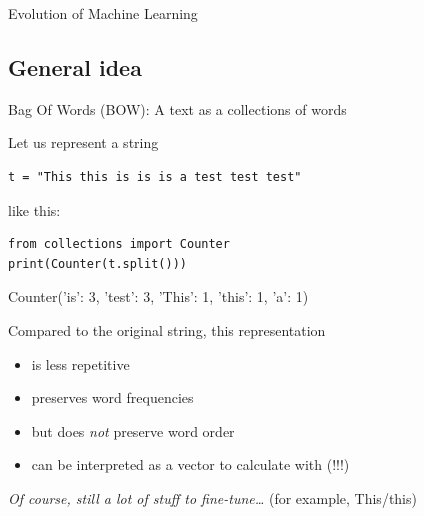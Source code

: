 \documentclass[compress]{beamer}
\begin{document}
\begin{frame}{Evolution of Machine Learning}
\centering
{}
\end{frame}



\subsection{General idea}

\begin{frame}[fragile]{Bag Of Words (BOW): A text as a collections of words}

Let us represent a string 
\begin{lstlisting}
t = "This this is is is a test test test"
\end{lstlisting}
like this:\\
\begin{lstlisting}
from collections import Counter
print(Counter(t.split()))
\end{lstlisting}
\begin{lstlistingoutput}
Counter({'is': 3, 'test': 3, 'This': 1, 'this': 1, 'a': 1})
\end{lstlistingoutput}

\pause 
Compared to the original string, this representation
\begin{itemize}
	\item is less repetitive
	\item preserves word frequencies
	\item but does \emph{not} preserve word order
	\item can be interpreted as a vector to calculate with (!!!)
\end{itemize}

\tiny{\emph{Of course, still a lot of stuff to fine-tune\ldots}  (for example, This/this)}
\end{frame}
\end{document}
